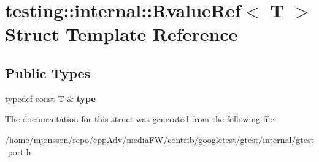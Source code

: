 \hypertarget{structtesting_1_1internal_1_1RvalueRef}{}\section{testing\+:\+:internal\+:\+:Rvalue\+Ref$<$ T $>$ Struct Template Reference}
\label{structtesting_1_1internal_1_1RvalueRef}
\subsection*{Public Types}
\begin{DoxyCompactItemize}
\item 
\mbox{\label{structtesting_1_1internal_1_1RvalueRef_ad09f1fbc87569c7e2837274193097e44}} 
typedef const T \& {\bfseries type}
\end{DoxyCompactItemize}


The documentation for this struct was generated from the following file\+:\begin{DoxyCompactItemize}
\item 
/home/mjonsson/repo/cpp\+Adv/media\+F\+W/contrib/googletest/gtest/internal/gtest-\/port.\+h\end{DoxyCompactItemize}
